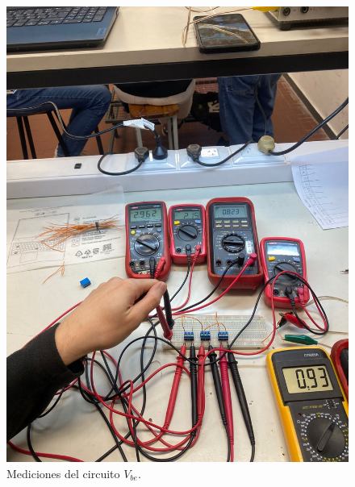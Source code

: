 \begin{figure}[!ht]
\begin{minipage}{0.5\textwidth}
        \end{minipage}
                    \begin{minipage}{0.5\textwidth}
            \includegraphics[width=1\textwidth]{tp3/pictures/setup_crkt-3_2.jpeg}
            \caption{Mediciones del circuito $V_{be}$.}

        \end{minipage}
        
 
    \end{figure}

